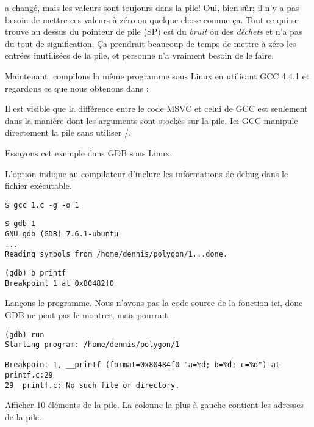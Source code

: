 \ESP a changé, mais les valeurs sont toujours dans la pile!
Oui, bien sûr; il n'y a pas besoin de mettre ces valeurs à zéro ou quelque chose
comme ça.
Tout ce qui se trouve au dessus du pointeur de pile (\ac{SP}) est du \emph{bruit}
ou des \emph{déchets} et n'a pas du tout de signification.
Ça prendrait beaucoup de temps de mettre à zéro les entrées inutilisées de la
pile, et personne n'a vraiment besoin de le faire.


Maintenant, compilons la même programme sous Linux en utilisant GCC 4.4.1 et regardons
ce que nous obtenons dans \IDA:



Il est visible que la différence entre le code MSVC et celui de GCC est seulement
dans la manière dont les arguments sont stockés sur la pile.
Ici GCC manipule directement la pile sans utiliser \PUSH/\POP.


Essayons cet exemple dans \ac{GDB} sous Linux.

L'option  indique au compilateur d'inclure les informations de debug dans
le fichier exécutable.

\begin{lstlisting}
$ gcc 1.c -g -o 1
\end{lstlisting}

\begin{lstlisting}
$ gdb 1
GNU gdb (GDB) 7.6.1-ubuntu
...
Reading symbols from /home/dennis/polygon/1...done.
\end{lstlisting}

\begin{lstlisting}[caption=let's set breakpoint on \printf]
(gdb) b printf
Breakpoint 1 at 0x80482f0
\end{lstlisting}

Lançons le programme.
Nous n'avons pas la code source de la fonction \printf ici, donc \ac{GDB} ne peut
pas le montrer, mais pourrait.

\begin{lstlisting}
(gdb) run
Starting program: /home/dennis/polygon/1

Breakpoint 1, __printf (format=0x80484f0 "a=%d; b=%d; c=%d") at printf.c:29
29	printf.c: No such file or directory.
\end{lstlisting}

Afficher 10 éléments de la pile. La colonne la plus à gauche contient les adresses
de la pile.

